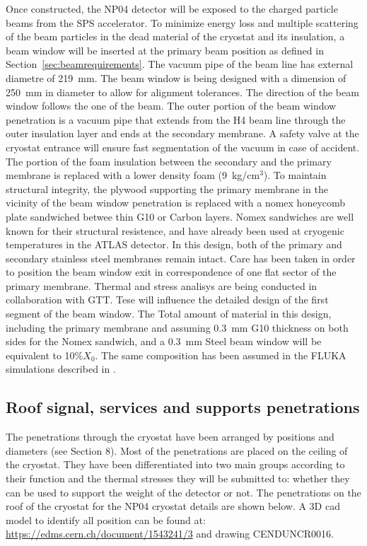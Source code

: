 Once constructed, the NP04 detector will be exposed to the charged
particle beams from the SPS accelerator. To minimize energy loss and
multiple scattering of the beam particles in the dead material of the
cryostat and its insulation, a beam window will be inserted at the primary beam position as defined  in Section~\ref{sec:beamrequirements}. 
  The vacuum pipe of the beam line has external diametre of 219~mm. The beam window is being designed with a dimension of 250~mm in diameter to allow for alignment tolerances.  The direction of the beam window follows the one of the beam.
The outer portion of the
beam window penetration is a vacuum pipe that extends from the H4 beam
line through the outer insulation layer and ends at the secondary
membrane. A safety valve at the cryostat entrance will ensure fast segmentation of the vacuum in case of accident.   The
portion of the foam insulation between the secondary and the primary
membrane is replaced with a lower density foam (9~kg/cm$^3$).
To maintain structural integrity, the plywood supporting
the primary membrane in the vicinity of the beam window penetration is
replaced with a nomex honeycomb plate sandwiched betwee thin G10 or Carbon layers. Nomex sandwiches are well known for their structural resistence, and have already been used at cryogenic temperatures in  the ATLAS detector.
 In this design, both of the
primary and secondary stainless steel membranes remain intact. Care has been taken in order to position the beam window exit in correspondence of one flat sector of the primary membrane.
Thermal and stress analisys are being conducted in collaboration with GTT. Tese will influence the detailed design of the first segment of the beam window. 
The Total amount of material in this design, including the primary membrane and assuming 0.3~mm G10 thickness on both sides for the Nomex sandwich, and a 0.3~mm Steel beam window will be equivalent to 10\%$X_0$. The same composition has been assumed in the FLUKA simulations described in \label{sec:beaminstruments}. 

\subsection{Roof signal, services and supports penetrations}

The penetrations through the cryostat have been arranged by positions and diameters (see Section 8). Most of the penetrations are placed on the ceiling of the cryostat. They have been differentiated into two main groups according to their function and the thermal stresses they will be submitted to: whether they can be used to support the weight of the detector or not.
The penetrations on the roof of the cryostat for the NP04 cryostat details are shown below.  A 3D cad model to identify all position can be found at:
\url{https://edms.cern.ch/document/1543241/3} and drawing CENDUNCR0016. 

